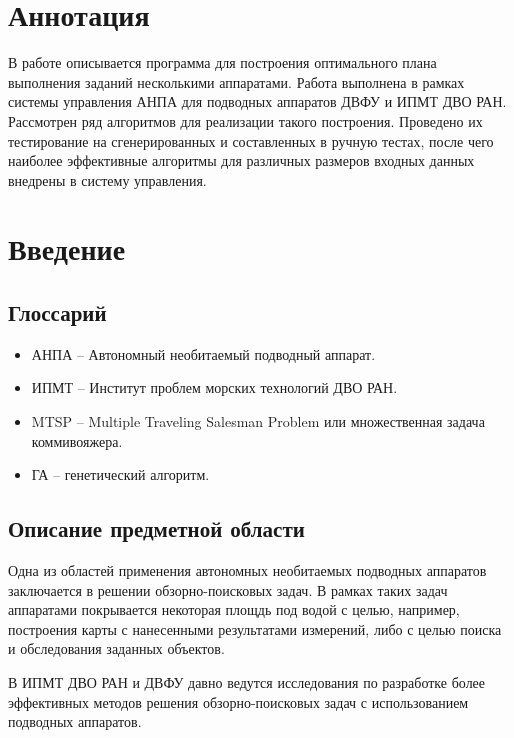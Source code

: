 \documentclass[a4paper,14pt,russian]{article}
\begin{document}
\tableofcontents
\newpage

\section*{Аннотация}

В работе описывается программа для построения оптимального плана выполнения заданий несколькими аппаратами. Работа выполнена в рамках системы управления АНПА для подводных аппаратов ДВФУ и ИПМТ ДВО РАН. Рассмотрен ряд алгоритмов для реализации такого построения. Проведено их тестирование на сгенерированных и составленных в ручную тестах, после чего наиболее эффективные алгоритмы для различных размеров входных данных внедрены в систему управления.

\section{Введение}
\subsection{Глоссарий}
\begin{itemize}
\item АНПА -- Автономный необитаемый подводный аппарат.
\item ИПМТ -- Институт проблем морских технологий ДВО РАН.
\item MTSP -- Multiple Traveling Salesman Problem или множественная задача коммивояжера.
\item ГА -- генетический алгоритм.
\end{itemize}

\subsection{Описание предметной области}


Одна из областей применения автономных необитаемых подводных аппаратов заключается в решении обзорно-поисковых задач. В рамках таких задач аппаратами покрывается некоторая площдь под водой с целью, например, построения карты с нанесенными результатами измерений, либо с целью поиска и обследования заданных объектов.

В ИПМТ ДВО РАН и ДВФУ давно ведутся исследования по разработке более эффективных методов решения обзорно-поисковых задач с использованием подводных аппаратов.
\end{document}
